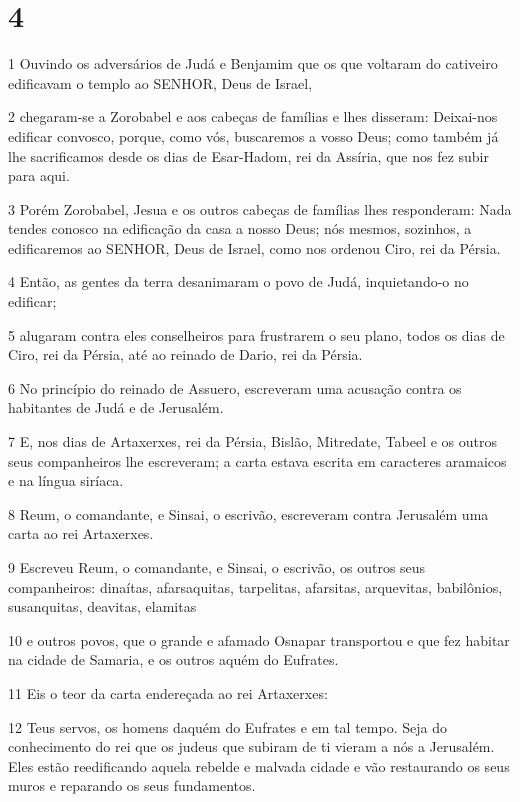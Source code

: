 \chapter{4}

\par 1 Ouvindo os adversários de Judá e Benjamim que os que voltaram do cativeiro edificavam o templo ao SENHOR, Deus de Israel,
\par 2 chegaram-se a Zorobabel e aos cabeças de famílias e lhes disseram: Deixai-nos edificar convosco, porque, como vós, buscaremos a vosso Deus; como também já lhe sacrificamos desde os dias de Esar-Hadom, rei da Assíria, que nos fez subir para aqui.
\par 3 Porém Zorobabel, Jesua e os outros cabeças de famílias lhes responderam: Nada tendes conosco na edificação da casa a nosso Deus; nós mesmos, sozinhos, a edificaremos ao SENHOR, Deus de Israel, como nos ordenou Ciro, rei da Pérsia.
\par 4 Então, as gentes da terra desanimaram o povo de Judá, inquietando-o no edificar;
\par 5 alugaram contra eles conselheiros para frustrarem o seu plano, todos os dias de Ciro, rei da Pérsia, até ao reinado de Dario, rei da Pérsia.
\par 6 No princípio do reinado de Assuero, escreveram uma acusação contra os habitantes de Judá e de Jerusalém.
\par 7 E, nos dias de Artaxerxes, rei da Pérsia, Bislão, Mitredate, Tabeel e os outros seus companheiros lhe escreveram; a carta estava escrita em caracteres aramaicos e na língua siríaca.
\par 8 Reum, o comandante, e Sinsai, o escrivão, escreveram contra Jerusalém uma carta ao rei Artaxerxes.
\par 9 Escreveu Reum, o comandante, e Sinsai, o escrivão, os outros seus companheiros: dinaítas, afarsaquitas, tarpelitas, afarsitas, arquevitas, babilônios, susanquitas, deavitas, elamitas
\par 10 e outros povos, que o grande e afamado Osnapar transportou e que fez habitar na cidade de Samaria, e os outros aquém do Eufrates.
\par 11 Eis o teor da carta endereçada ao rei Artaxerxes:
\par 12 Teus servos, os homens daquém do Eufrates e em tal tempo. Seja do conhecimento do rei que os judeus que subiram de ti vieram a nós a Jerusalém. Eles estão reedificando aquela rebelde e malvada cidade e vão restaurando os seus muros e reparando os seus fundamentos.
